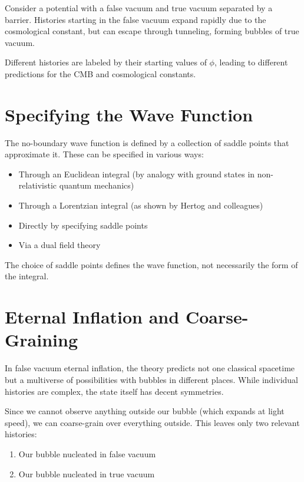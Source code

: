 \documentclass[12pt,a4paper]{article}
\begin{document}
Consider a potential with a false vacuum and true vacuum separated by a barrier. Histories starting in the false vacuum expand rapidly due to the cosmological constant, but can escape through tunneling, forming bubbles of true vacuum.

Different histories are labeled by their starting values of $\phi$, leading to different predictions for the CMB and cosmological constants.

\section{Specifying the Wave Function}

The no-boundary wave function is defined by a collection of saddle points that approximate it. These can be specified in various ways:

\begin{itemize}
    \item Through an Euclidean integral (by analogy with ground states in non-relativistic quantum mechanics)
    \item Through a Lorentzian integral (as shown by Hertog and colleagues)
    \item Directly by specifying saddle points
    \item Via a dual field theory
\end{itemize}

The choice of saddle points defines the wave function, not necessarily the form of the integral.

\section{Eternal Inflation and Coarse-Graining}

In false vacuum eternal inflation, the theory predicts not one classical spacetime but a multiverse of possibilities with bubbles in different places. While individual histories are complex, the state itself has decent symmetries.

Since we cannot observe anything outside our bubble (which expands at light speed), we can coarse-grain over everything outside. This leaves only two relevant histories:
\begin{enumerate}
    \item Our bubble nucleated in false vacuum
    \item Our bubble nucleated in true vacuum
\end{enumerate}
\end{document}
